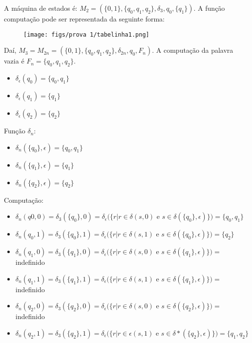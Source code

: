\documentclass{article}
\begin{document}
\begin{solution} 
A máquina de estados é: $M_2 = (\{0,1\}, \{q_0,q_1,q_2\}, \delta_3, q_0, \{q_1\})$. A função computação pode ser representada da seguinte forma:
\begin{figure}[H]
    \centering
    \texttt{[image: figs/prova 1/tabelinha1.png]}
\end{figure}
\noindent Daí, $M_3=M_{2n} = (\{0,1\},\{q_0,q_1,q_2\}, \delta_{2n}, q_0, F_n)$. A computação da palavra vazia é $F_n = \{q_0,q_1,q_2\}$.
\begin{itemize}
    \item $\delta_{\epsilon}(q_0) = \{q_0,q_1\}$
    \item $\delta_{\epsilon}(q_1) = \{q_1\}$
    \item $\delta_{\epsilon}(q_2) = \{q_2\}$
\end{itemize}
Função $\delta_n$:
\begin{itemize}
    \item $\delta_n(\{q_0\}, \epsilon) = \{q_0, q_1\}$
    \item $\delta_n(\{q_1\}, \epsilon) = \{q_1\}$ 
    \item $\delta_n(\{q_2\}, \epsilon) = \{q_2\}$
\end{itemize}
Computação:
\begin{itemize}
    \item $\delta_n(q0, 0) = \delta_3(\{q_0\}, 0) = \delta_{\epsilon}(\{ r | r \in \delta(s, 0)$ e $s \in \delta(\{ q_0 \}, \epsilon)\}) = \{q_0, q_1\}$
\item $\delta_n(q_0, 1) = \delta_3(\{q_0\}, 1) = \delta_{\epsilon}(\{ r | r \in \delta(s, 1)$ e $s \in \delta(\{ q_0 \}, \epsilon)\}) = \{q_2\}$
\item $\delta_n(q_1, 0) = \delta_3(\{q_1\}, 0) = \delta_{\epsilon}(\{ r | r \in \delta(s, 0)$ e $s \in \delta(\{ q_1 \}, \epsilon)\}) =$ indefinido
\item $\delta_n(q_1, 1) = \delta_3(\{q_1\}, 1) = \delta_{\epsilon}(\{ r | r \in \delta(s, 1)$ e $s \in \delta(\{ q_1 \}, \epsilon)\}) =$ indefinido
\item $\delta_n(q_2, 0) = \delta_3(\{q_2\}, 0) = \delta_{\epsilon}(\{ r | r \in \delta(s, 0)$ e $s \in \delta(\{ q_2 \}, \epsilon)\}) =$ indefinido
\item $\delta_n(q_2, 1) = \delta_3(\{q_2\}, 1) = \delta_{\epsilon}(\{ r | r \in \epsilon(s, 1)$ e $s \in \delta*(\{ q_2 \}, \epsilon)\}) = \{q_1, q_2\}$
\end{itemize}

\end{solution}
\end{document}

